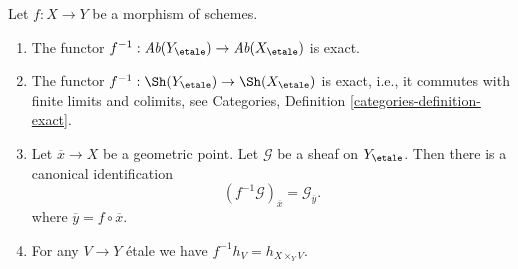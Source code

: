 \begin{lemma}
\label{lemma-stalk-pullback}
Let $f : X \to Y$ be a morphism of schemes.
\begin{enumerate}
\item The functor
$f^{-1} : \textit{Ab}(Y_\etale) \to \textit{Ab}(X_\etale)$
is exact.
\item The functor
$f^{-1} : \Sh(Y_\etale) \to \Sh(X_\etale)$
is exact, i.e., it commutes with finite limits and colimits, see
Categories, Definition \ref{categories-definition-exact}.
\item Let $\overline{x} \to X$ be a geometric point.
Let $\mathcal{G}$ be a sheaf on $Y_\etale$.
Then there is a canonical identification
$$
(f^{-1}\mathcal{G})_{\overline{x}} = \mathcal{G}_{\overline{y}}.
$$
where $\overline{y} = f \circ \overline{x}$.
\item For any $V \to Y$ \'etale we have $f^{-1}h_V = h_{X \times_Y V}$.
\end{enumerate}
\end{lemma}

